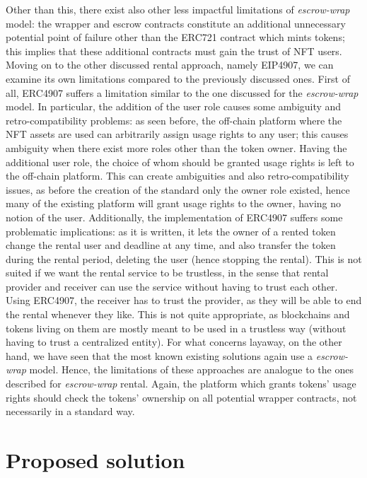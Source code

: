 \documentclass[english, LaM, oneside]{sapthesis}%
\begin{document}
Other than this, there exist also other less impactful limitations of \textit{escrow-wrap} model: the wrapper and escrow contracts constitute an additional unnecessary potential point of failure other than the ERC721 contract which mints tokens; this implies that these additional contracts must gain the trust of NFT users.\newline
Moving on to the other discussed rental approach, namely EIP4907, we can examine its own limitations compared to the previously discussed ones. First of all, ERC4907 suffers a limitation similar to the one discussed for the \textit{escrow-wrap} model. In particular, the addition of the user role causes some ambiguity and retro-compatibility problems: as seen before, the off-chain platform where the NFT assets are used can arbitrarily assign usage rights to any user; this causes ambiguity when there exist more roles other than the token owner. Having the additional user role, the choice of whom should be granted usage rights is left to the off-chain platform. This can create ambiguities and also retro-compatibility issues, as before the creation of the standard only the owner role existed, hence many of the existing platform will grant usage rights to the owner, having no notion of the user.\newline
Additionally, the implementation of ERC4907 suffers some problematic implications: as it is written, it lets the owner of a rented token change the rental user and deadline at any time, and also transfer the token during the rental period, deleting the user (hence stopping the rental). This is not suited if we want the rental service to be trustless, in the sense that rental provider and receiver can use the service without having to trust each other. Using ERC4907, the receiver has to trust the provider, as they will be able to end the rental whenever they like. This is not quite appropriate, as blockchains and tokens living on them are mostly meant to be used in a trustless way (without having to trust a centralized entity).\newline
For what concerns layaway, on the other hand, we have seen that the most known existing solutions again use a \textit{escrow-wrap} model. Hence, the limitations of these approaches are analogue to the ones described for \textit{escrow-wrap} rental. Again, the platform which grants tokens' usage rights should check the tokens' ownership on all potential wrapper contracts, not necessarily in a standard way.


\chapter{Proposed solution}
\label{chap:2}
\end{document}

